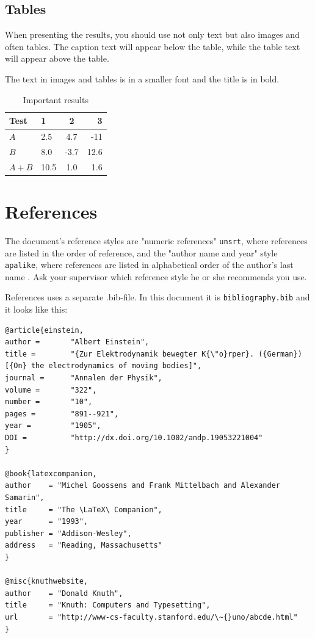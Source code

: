 \documentclass[english,twoside,openright]{HYgradu}
\begin{document}
\section{Tables}

When presenting the results, you should use not only text but also
images and often tables. The caption text will appear below the table,
while the table text will appear above the table.

The text in images and tables is in a smaller font and the title is in bold.

\begin{table}
	\centering
	\caption{Important results}
	\label{tab:symbols}
	\begin{tabular}{l||l c r} %
		Test & 1 & 2 & 3 \\ 
		\hline \hline %
		$A$ & 2.5 & 4.7 & -11 \\
		$B$ & 8.0 & -3.7 & 12.6 \\
		$A+B$ & 10.5 & 1.0 & 1.6 \\
		\hline
	\end{tabular}
\end{table}

\chapter{References}

The document's reference styles are "numeric references"
\texttt{unsrt}, where references are listed in the order of reference,
and the "author name and year" style \texttt{apalike}, where
references are listed in alphabetical order of the author's last name
. Ask your supervisor which reference style he or she recommends you
use.

References uses a separate .bib-file. In this document it is \texttt{bibliography.bib} and it looks like this:
\begin{verbatim}
@article{einstein,
author =       "Albert Einstein",
title =        "{Zur Elektrodynamik bewegter K{\"o}rper}. ({German})
[{On} the electrodynamics of moving bodies]",
journal =      "Annalen der Physik",
volume =       "322",
number =       "10",
pages =        "891--921",
year =         "1905",
DOI =          "http://dx.doi.org/10.1002/andp.19053221004"
}

@book{latexcompanion,
author    = "Michel Goossens and Frank Mittelbach and Alexander Samarin",
title     = "The \LaTeX\ Companion",
year      = "1993",
publisher = "Addison-Wesley",
address   = "Reading, Massachusetts"
}

@misc{knuthwebsite,
author    = "Donald Knuth",
title     = "Knuth: Computers and Typesetting",
url       = "http://www-cs-faculty.stanford.edu/\~{}uno/abcde.html"
}
\end{verbatim}
\end{document}
